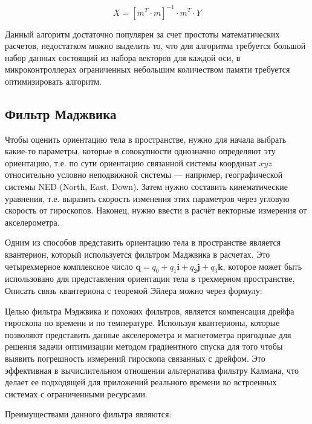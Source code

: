\begin{equation}
    \label{eq:domain:XL_CALIB}
    X = \left[m^T \cdot m\right]^{-1}\cdot m^T \cdot Y
  \end{equation}

Данный алгоритм достаточно популярен за счет простоты математических расчетов, недостатком можно выделить то, что 
для алгоритма требуется большой набор данных состоящий из набора векторов для каждой оси, в микроконтроллерах ограниченных небольшим 
количеством памяти требуется оптимизировать алгоритм. 

\subsection{Фильтр Маджвика}

Чтобы оценить ориентацию тела в пространстве, нужно для начала выбрать какие-то параметры, 
которые в совокупности однозначно определяют эту ориентацию, т.е. по сути ориентацию связанной 
системы координат $xyz$ относительно условно неподвижной системы — например, географической системы NED (North, East, Down). 
Затем нужно составить кинематические уравнения, т.е. выразить скорость изменения этих параметров через угловую скорость от 
гироскопов. Наконец, нужно ввести в расчёт векторные измерения от акселерометра.

Одним из способов представить ориентацию тела в пространстве является квантерион, который используется фильтром Маджвика в расчетах.
Это четырехмерное комплексное число $\mathbf{q}=q_{0}+q_{1}\mathbf{i}+q_{2}\mathbf{j}+q_{3}\mathbf{k}$, которое может быть использовано 
для представления ориентации тела в трехмерном пространстве,
Описать связь квантериона с теоремой Эйлера можно через формулу: 


Целью фильтра Мэджвика и похожих фильтров, является компенсация дрейфа гироскопа по времени и по температуре.
Используя квантерионы, которые позволяют представить данные акселерометра и магнетометра пригодные для решения задачи оптимизации 
методом градиентного спуска для того чтобы выявить погрешность измерений гироскопа связанных с дрейфом. Это эффективная в 
вычислительном отношении альтернатива фильтру Калмана, что делает ее подходящей для приложений реального времени во встроенных 
системах с ограниченными ресурсами. 

Преимуществами данного фильтра являются:

